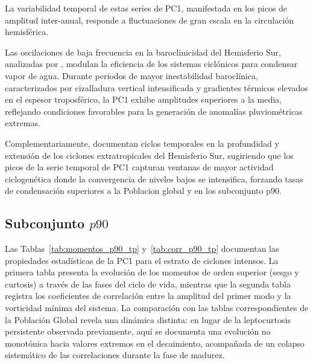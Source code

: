 La variabilidad temporal de estas series de PC1, manifestada en los picos de amplitud inter-anual, responde a fluctuaciones de gran escala en la circulación hemisférica. 


Las oscilaciones de baja frecuencia en la baroclinicidad del Hemisferio Sur, analizadas por \citet{machado2020influence}, modulan la eficiencia de los sistemas ciclónicos para condensar vapor de agua. 
Durante periodos de mayor inestabilidad baroclínica, caracterizados por cizalladura vertical intensificada y gradientes térmicos elevados en el espesor troposférico, la PC1 exhibe amplitudes superiores a la media, reflejando condiciones favorables para la generación de anomalías pluviométricas extremas. 

Complementariamente, \citet{simmonds2000variability} documentan ciclos temporales en la profundidad y extensión de los ciclones extratropicales del Hemisferio Sur, sugiriendo que los picos de la serie temporal de PC1 capturan ventanas de mayor actividad ciclogenética donde la convergencia de niveles bajos se intensifica, forzando tasas de condensación superiores a la Poblacion global y en los subconjunto p90.

\subsection{Subconjunto $p90$}\label{subsubsec:pc1_p90_tp}




Las Tablas~\ref{tab:momentos_p90_tp} y~\ref{tab:corr_p90_tp} documentan las propiedades estadísticas de la PC1 para el estrato de ciclones intensos. La primera tabla presenta la evolución de los momentos de orden superior (sesgo y curtosis) a través de las fases del ciclo de vida, mientras que la segunda tabla registra los coeficientes de correlación entre la amplitud del primer modo y la vorticidad mínima del sistema. 
La comparación con las tablas correspondientes de la Población Global revela una dinámica distinta: en lugar de la leptocurtosis persistente observada previamente, aquí se documenta una evolución no monotónica hacia valores extremos en el decaimiento, acompañada de un colapso sistemático de las correlaciones durante la fase de madurez.

